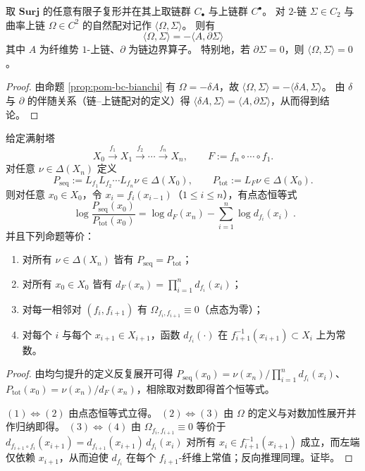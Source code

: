 \begin{theorem}\label{thm:pom-bc-discrete-stokes}
取 \(\mathbf{Surj}\) 的任意有限子复形并在其上取链群 \(C_\bullet\) 与上链群 \(C^\bullet\)。
对 \(2\)-链 \(\Sigma\in C_2\) 与曲率上链 \(\Omega\in C^2\) 的自然配对记作 \(\langle\Omega,\Sigma\rangle\)。
则有
\[
\boxed{\;\langle \Omega,\Sigma\rangle=-\langle A,\partial\Sigma\rangle\;}
\]
其中 \(A\) 为纤维势 \(1\)-上链、\(\partial\) 为链边界算子。
特别地，若 \(\partial\Sigma=0\)，则 \(\langle\Omega,\Sigma\rangle=0\)。
\end{theorem}
\begin{proof}
由命题 \ref{prop:pom-bc-bianchi} 有 \(\Omega=-\delta A\)，故
\(
\langle\Omega,\Sigma\rangle=-\langle\delta A,\Sigma\rangle
\)。
由 \(\delta\) 与 \(\partial\) 的伴随关系（链--上链配对的定义）得
\(
\langle\delta A,\Sigma\rangle=\langle A,\partial\Sigma\rangle
\)，从而得到结论。
\end{proof}

\begin{theorem}\label{thm:pom-bc-tower-flatness}
给定满射塔
\[
X_0 \xrightarrow{f_1} X_1 \xrightarrow{f_2} \cdots \xrightarrow{f_n} X_n,
\qquad F:=f_n\circ\cdots\circ f_1.
\]
对任意 \(\nu\in\Delta(X_n)\) 定义
\[
P_{\mathrm{seq}}:=L_{f_1}L_{f_2}\cdots L_{f_n}\nu\in\Delta(X_0),\qquad
P_{\mathrm{tot}}:=L_F\nu\in\Delta(X_0).
\]
则对任意 \(x_0\in X_0\)，令 \(x_i=f_i(x_{i-1})\)（\(1\le i\le n\)），有点态恒等式
\[
\boxed{\;
\log\frac{P_{\mathrm{seq}}(x_0)}{P_{\mathrm{tot}}(x_0)}
=\log d_F(x_n)-\sum_{i=1}^n \log d_{f_i}(x_i)\; }.
\]
并且下列命题等价：
\begin{enumerate}
  \item 对所有 \(\nu\in\Delta(X_n)\) 皆有 \(P_{\mathrm{seq}}=P_{\mathrm{tot}}\)；
  \item 对所有 \(x_0\in X_0\) 皆有 \(d_F(x_n)=\prod_{i=1}^n d_{f_i}(x_i)\)；
  \item 对每一相邻对 \((f_i,f_{i+1})\) 有 \(\Omega_{f_i,f_{i+1}}\equiv 0\)（点态为零）；
  \item 对每个 \(i\) 与每个 \(x_{i+1}\in X_{i+1}\)，函数 \(d_{f_i}(\cdot)\) 在 \(f_{i+1}^{-1}(x_{i+1})\subset X_i\) 上为常数。
\end{enumerate}
\end{theorem}
\begin{proof}
由均匀提升的定义反复展开可得
\(
P_{\mathrm{seq}}(x_0)=\nu(x_n)\big/\prod_{i=1}^n d_{f_i}(x_i)
\)、
\(
P_{\mathrm{tot}}(x_0)=\nu(x_n)\big/d_F(x_n)
\)，相除取对数即得首个恒等式。
\par
\((1)\Leftrightarrow(2)\) 由点态恒等式立得。
\((2)\Leftrightarrow(3)\) 由 \(\Omega\) 的定义与对数加性展开并作归纳即得。
\((3)\Leftrightarrow(4)\) 由 \(\Omega_{f_i,f_{i+1}}\equiv 0\) 等价于
\(
d_{f_{i+1}\circ f_i}(x_{i+1})=d_{f_{i+1}}(x_{i+1})\,d_{f_i}(x_i)
\)
对所有 \(x_i\in f_{i+1}^{-1}(x_{i+1})\) 成立，而左端仅依赖 \(x_{i+1}\)，从而迫使 \(d_{f_i}\) 在每个 \(f_{i+1}\)-纤维上常值；反向推理同理。证毕。
\end{proof}

